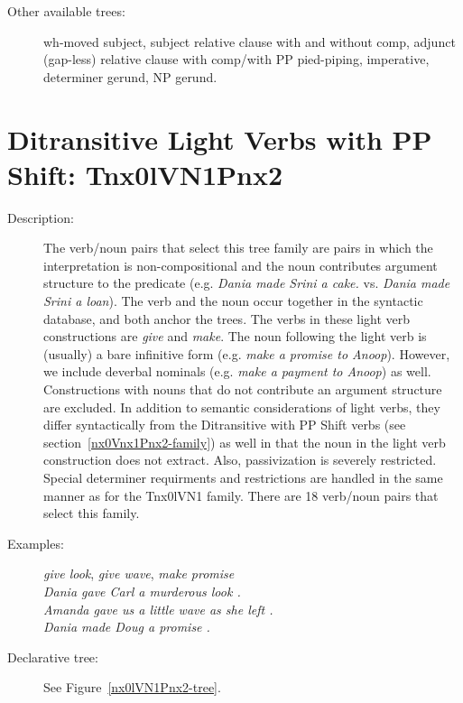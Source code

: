 \begin{description}
\item[Other available trees:] wh-moved subject, subject relative clause with and without comp, 
adjunct (gap-less) relative clause with comp/with PP pied-piping, 
imperative, determiner gerund, NP gerund. 
 
\end{description} 
 
 
 
 
\section{Ditransitive Light Verbs with PP Shift: Tnx0lVN1Pnx2} 
\label{nx0lVN1Pnx2-family} 
 
\begin{description} 
 
\item[Description:]  The verb/noun pairs that select this tree family are 
pairs in which the interpretation is non-compositional and the noun 
contributes argument structure to the predicate (e.g. {\it Dania made Srini a cake.} vs.  {\it Dania made Srini a loan}).  The verb and the 
noun occur together in the syntactic database, and both anchor the 
trees.  The verbs in these light verb constructions are {\it give} and 
{\it make}.  The noun following the light verb is (usually) a bare 
infinitive form (e.g. {\it make a promise to Anoop}).  However, we 
include deverbal nominals (e.g. {\it make a payment to Anoop}) as 
well.  Constructions with nouns that do not contribute an argument 
structure are excluded.  In addition to semantic considerations of 
light verbs, they differ syntactically from the Ditransitive with PP 
Shift verbs (see section~\ref{nx0Vnx1Pnx2-family}) as well in that the 
noun in the light verb construction does not extract.  Also, 
passivization is severely restricted.  Special determiner requirments 
and restrictions are handled in the same manner as for the Tnx0lVN1 
family.  There are 18 verb/noun pairs that select this family. 
 
\item[Examples:] {\it give look}, {\it give wave}, {\it make promise} \\ 
{\it Dania gave Carl a murderous look .} \\ 
{\it Amanda gave us a little wave as she left .} \\ 
{\it Dania made Doug a promise .} 
 
\item[Declarative tree:]  See Figure~\ref{nx0lVN1Pnx2-tree}. 
 

\end{description}
